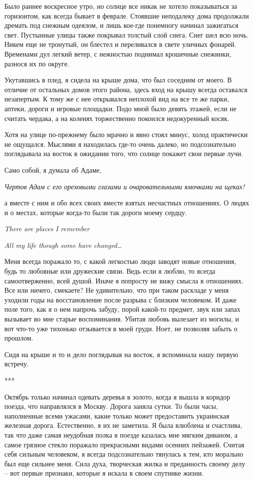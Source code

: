 \documentclass[
]{book}
\begin{document}
Было раннее воскресное утро, но солнце все никак не хотело показываться за горизонтом, как всегда бывает в феврале. Стоявшие неподалеку дома продолжали дремать под снежным одеялом, и лишь кое-где понемногу начинал зажигаться свет. Пустынные улицы также покрывал толстый слой снега. Снег шел всю ночь. Никем еще не тронутый, он блестел и переливался в свете уличных фонарей. Временами дул легкий ветер, с нежностью поднимал крошечные снежинки, разнося их по округе.

Укутавшись в плед, я сидела на крыше дома, что был соседним от моего. В отличие от остальных домов этого района, здесь вход на крышу всегда оставался незапертым. К тому же с нее открывался неплохой вид на все те же парки, аптеки, дороги и игровые площадки. Подо мной было девять этажей, если не считать чердака, а на коленях торжественно покоился недокуренный косяк.

Хотя на улице по-прежнему было мрачно и явно стоял минус, холод практически не ощущался. Мыслями я находилась где-то очень далеко, но подсознательно поглядывала на восток в ожидании того, что солнце покажет свои первые лучи.

Само собой, я думала об Адаме,

\emph{Чертов Адам с его ореховыми глазами и очаровательными ямочками на щеках!}

а вместе с ним и обо всех своих вместе взятых несчастных отношениях. О людях и о местах, которые когда-то были так дороги моему сердцу.

\emph{There are places I remember}

\emph{All my life though some have changed\ldots{}}

Меня всегда поражало то, с какой легкостью люди заводят новые отношения, будь то любовные или дружеские связи. Ведь если я люблю, то всегда самоотверженно, всей душой. Иначе я попросту не вижу смысла в отношениях. Все или ничего, смекаете? Не удивительно, что при таком раскладе у меня уходили годы на восстановление после разрыва с близким человеком. И даже поле того, как я о нем напрочь забуду, порой какой-то предмет, звук или запах вызывает во мне старые воспоминания. Убитая любовь вылезает из могилы, и вот что-то уже тихонько отзывается в моей груди. Ноет, не позволяя забыть о прошлом.

Сидя на крыше и то и дело поглядывая на восток, я вспоминала нашу первую встречу.

***

Октябрь только начинал одевать деревья в золото, когда я вышла в коридор поезда, что направлялся в Москву. Дорога заняла сутки. То были часы, наполненные всеми ужасами, какие только может предоставить украинская железная дорога. Естественно, я их не заметила. Я была влюблена и счастлива, так что даже самая неудобная полка в поезде казалась мне мягким диваном, а самое грязное стекло поражало прекрасными видами осенних пейзажей. Считая себя сильным человеком, я всегда подсознательно тянулась к тем, кто морально был еще сильнее меня. Сила духа, творческая жилка и преданность своему делу -- вот первые признаки, которые я искала в своем спутнике жизни.
\end{document}
